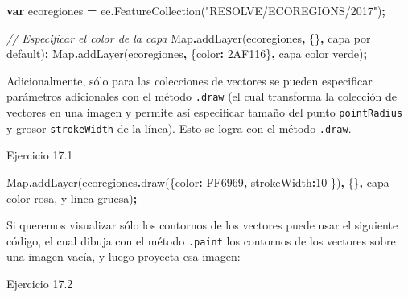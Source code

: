 \documentclass[
  12pt,
  letterpaper,
  twoside]{book}
\newenvironment{Shaded}{\begin{snugshade}}{\end{snugshade}}
\newcommand{\BuiltInTok}[1]{#1}
\newcommand{\CommentTok}[1]{\textcolor[rgb]{0.56,0.35,0.01}{\textit{#1}}}
\newcommand{\DataTypeTok}[1]{\textcolor[rgb]{0.13,0.29,0.53}{#1}}
\newcommand{\DecValTok}[1]{\textcolor[rgb]{0.00,0.00,0.81}{#1}}
\newcommand{\FunctionTok}[1]{\textcolor[rgb]{0.00,0.00,0.00}{#1}}
\newcommand{\KeywordTok}[1]{\textcolor[rgb]{0.13,0.29,0.53}{\textbf{#1}}}
\newcommand{\NormalTok}[1]{#1}
\newcommand{\OperatorTok}[1]{\textcolor[rgb]{0.81,0.36,0.00}{\textbf{#1}}}
\newcommand{\StringTok}[1]{\textcolor[rgb]{0.31,0.60,0.02}{#1}}
\begin{document}
\begin{Shaded}
\begin{Highlighting}[]
\KeywordTok{var}\NormalTok{ ecoregiones }\OperatorTok{=}\NormalTok{ ee}\OperatorTok{.}\FunctionTok{FeatureCollection}\NormalTok{(}\StringTok{"RESOLVE/ECOREGIONS/2017"}\NormalTok{)}\OperatorTok{;}

\CommentTok{// Especificar el color de la capa }
\BuiltInTok{Map}\OperatorTok{.}\FunctionTok{addLayer}\NormalTok{(ecoregiones}\OperatorTok{,}\NormalTok{ \{\}}\OperatorTok{,} \StringTok{\textquotesingle{}capa por default\textquotesingle{}}\NormalTok{)}\OperatorTok{;}
\BuiltInTok{Map}\OperatorTok{.}\FunctionTok{addLayer}\NormalTok{(ecoregiones}\OperatorTok{,}\NormalTok{ \{}\DataTypeTok{color}\OperatorTok{:} \StringTok{\textquotesingle{}2AF116\textquotesingle{}}\NormalTok{\}}\OperatorTok{,} \StringTok{\textquotesingle{}capa color verde\textquotesingle{}}\NormalTok{)}\OperatorTok{;}
\end{Highlighting}
\end{Shaded}

Adicionalmente, sólo para las colecciones de vectores se pueden especificar parámetros adicionales con el método \texttt{.draw} (el cual transforma la colección de vectores en una imagen y permite así especificar tamaño del punto \texttt{pointRadius} y grosor \texttt{strokeWidth} de la línea). Esto se logra con el método \texttt{.draw}.

Ejercicio 17.1

\begin{Shaded}
\begin{Highlighting}[]
\BuiltInTok{Map}\OperatorTok{.}\FunctionTok{addLayer}\NormalTok{(ecoregiones}\OperatorTok{.}\FunctionTok{draw}\NormalTok{(\{}\DataTypeTok{color}\OperatorTok{:} \StringTok{\textquotesingle{}FF6969\textquotesingle{}}\OperatorTok{,} \DataTypeTok{strokeWidth}\OperatorTok{:}\DecValTok{10}\NormalTok{ \})}\OperatorTok{,}\NormalTok{ \{\}}\OperatorTok{,}
  \StringTok{\textquotesingle{}capa color rosa, y linea gruesa\textquotesingle{}}\NormalTok{)}\OperatorTok{;}
\end{Highlighting}
\end{Shaded}

Si queremos visualizar sólo los contornos de los vectores puede usar el siguiente código, el cual dibuja con el método \texttt{.paint} los contornos de los vectores sobre una imagen vacía, y luego proyecta esa imagen:

Ejercicio 17.2
\end{document}
